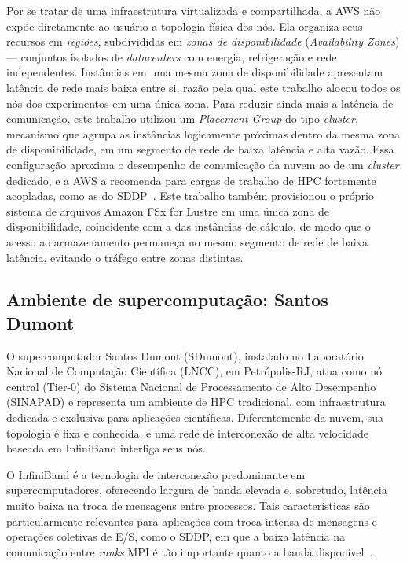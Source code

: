 Por se tratar de uma infraestrutura virtualizada e compartilhada, a AWS
não expõe diretamente ao usuário a topologia física dos nós. Ela
organiza seus recursos em \textit{regiões}, subdivididas em
\textit{zonas de disponibilidade} (\textit{Availability Zones}) ---
conjuntos isolados de \textit{datacenters} com energia, refrigeração e
rede independentes. Instâncias em uma mesma zona de disponibilidade
apresentam latência de rede mais baixa entre si, razão pela qual este
trabalho alocou todos os nós dos experimentos em uma única zona. Para reduzir ainda
mais a latência de comunicação, este trabalho utilizou um \textit{Placement
Group} do tipo \textit{cluster}, mecanismo que agrupa as instâncias logicamente
próximas dentro da mesma zona de disponibilidade, em um segmento de rede de
baixa latência e alta vazão. Essa configuração aproxima o desempenho de
comunicação da nuvem ao de um \textit{cluster} dedicado, e a AWS a recomenda
para cargas de trabalho de HPC fortemente acopladas, como as do
SDDP~\cite{aws:placement}. Este trabalho também provisionou o próprio sistema de arquivos Amazon
FSx for Lustre em uma única zona de disponibilidade,
coincidente com a das instâncias de cálculo, de modo que o acesso ao
armazenamento permaneça no mesmo segmento de rede de baixa latência,
evitando o tráfego entre zonas distintas.

\subsection{Ambiente de supercomputação: Santos Dumont}
\label{sec:ambiente_sdumont}
O supercomputador Santos Dumont (SDumont), instalado no Laboratório
Nacional de Computação Científica (LNCC), em Petrópolis-RJ, atua como nó
central (Tier-0) do Sistema Nacional de Processamento de Alto Desempenho
(SINAPAD) e representa um ambiente de HPC tradicional, com infraestrutura
dedicada e exclusiva para aplicações científicas. Diferentemente da nuvem,
sua topologia é fixa e conhecida, e uma rede de
interconexão de alta velocidade baseada em InfiniBand interliga seus nós.

O InfiniBand é a tecnologia de interconexão predominante em
supercomputadores, oferecendo largura de banda elevada e, sobretudo,
latência muito baixa na troca de mensagens entre processos. Tais
características são particularmente relevantes para aplicações com troca
intensa de mensagens e operações coletivas de E/S, como o SDDP, em que a
baixa latência na comunicação entre \textit{ranks} MPI é tão importante
quanto a banda disponível~\cite{Fds:03,RlGmmts:05}.

